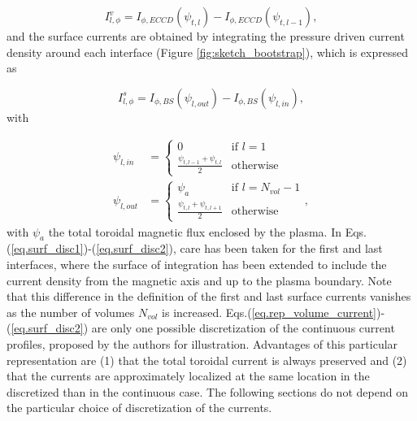 \documentclass[my_thesis.tex]{subfiles}
\begin{document}
\begin{equation}
    I^v_{l,\phi} = I_{\phi,ECCD}(\psi_{t,l}) - I_{\phi,ECCD}(\psi_{t,l-1}), \label{eq.rep_volume_current}
\end{equation}
and the surface currents are obtained by integrating the pressure driven current density around each interface (Figure \ref{fig:sketch_bootstrap}), which is expressed as

\begin{equation}
    I^s_{l,\phi} = I_{\phi,BS}(\psi_{l,out}) - I_{\phi,BS}(\psi_{l,in}), \label{eq.rep_surface_current}
\end{equation}
with

\begin{align}
    \psi_{l,in} &= \begin{cases}
    0 & \text{if } l=1\\
    \frac{\psi_{t,l-1} + \psi_{t,l}}{2} & \text{otherwise}
    \end{cases}\label{eq.surf_disc1} \\
    \psi_{l,out} &= \begin{cases}
    \psi_{a} & \text{if } l=N_{vol}-1\\
    \frac{\psi_{t,l} + \psi_{t,l+1}}{2} & \text{otherwise}
    \end{cases},\label{eq.surf_disc2}
\end{align}
with $\psi_{a}$ the total toroidal magnetic flux enclosed by the plasma. In Eqs.(\ref{eq.surf_disc1})-(\ref{eq.surf_disc2}), care has been taken for the first and last interfaces, where the surface of integration has been extended to include the current density from the magnetic axis and up to the plasma boundary. Note that this difference in the definition of the first and last surface currents vanishes as the number of volumes $N_{vol}$ is increased. Eqs.(\ref{eq.rep_volume_current})-(\ref{eq.surf_disc2}) are only one possible discretization of the continuous current profiles, proposed by the authors for illustration. Advantages of this particular representation are (1) that the total toroidal current is always preserved and (2) that the currents are approximately localized at the same location in the discretized than in the continuous case. The following sections do not depend on the particular choice of discretization of the currents.
\end{document}
